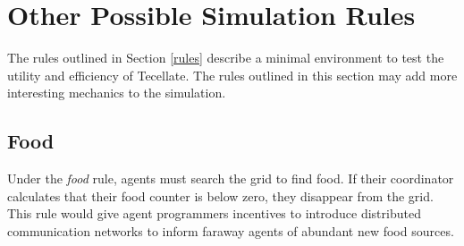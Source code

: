 \section{Other Possible Simulation Rules}

The rules outlined in Section \ref{rules} describe a minimal environment to test the utility and efficiency of Tecellate. The rules outlined in this section may add more interesting mechanics to the simulation.

\subsection{Food}

Under the \emph{food} rule, agents must search the grid to find food. If their coordinator calculates that their food counter is below zero, they disappear from the grid. This rule would give agent programmers incentives to introduce distributed communication networks to inform faraway agents of abundant new food sources.

\subsection{}